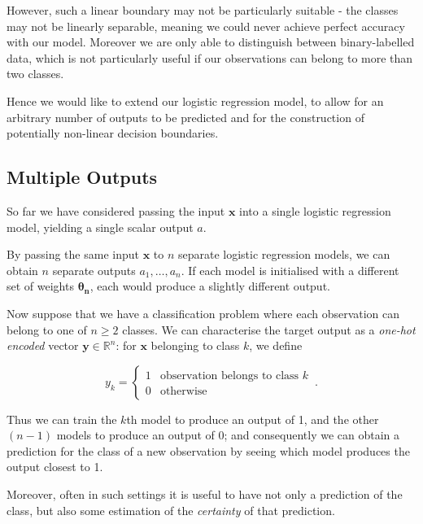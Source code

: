 \documentclass{article}[11pt]
\begin{document}
    However, such a linear boundary may not be particularly suitable - the classes may not be linearly separable, meaning we could never achieve perfect accuracy with our model. Moreover we are only able to distinguish between binary-labelled data, which is not particularly useful if our observations can belong to more than two classes.
    
    Hence we would like to extend our logistic regression model, to allow for an arbitrary number of outputs to be predicted and for the construction of potentially non-linear decision boundaries.
    
    

    \subsection{Multiple Outputs} \label{sec:multi_out}
    
        So far we have considered passing the input $\mathbf{x}$ into a single logistic regression model, yielding a single scalar output $a$.
    
        By passing the same input $\mathbf{x}$ to $n$ separate logistic regression models, we can obtain $n$ separate outputs $a_1, \ldots, a_n$. If each model is initialised with a different set of weights $\boldsymbol{\theta_n}$, each would produce a slightly different output.
        
        Now suppose that we have a classification problem where each observation can belong to one of $n \geq 2$ classes. We can characterise the target output as a \textit{one-hot encoded} vector $\mathbf{y} \in \mathbb{R}^n$: for $\mathbf{x}$ belonging to class $k$, we define
        
        $$
        y_k = \begin{cases}
            1 & \text{observation belongs to class } k \\
            0 & \text{otherwise}
        \end{cases} \,.
        $$
        
        Thus we can train the $k$th model to produce an output of 1, and the other $(n-1)$ models to produce an output of 0; and consequently we can obtain a prediction for the class of a new observation by seeing which model produces the output closest to 1.

        Moreover, often in such settings it is useful to have not only a prediction of the class, but also some estimation of the \textit{certainty} of that prediction.
        
\end{document}

